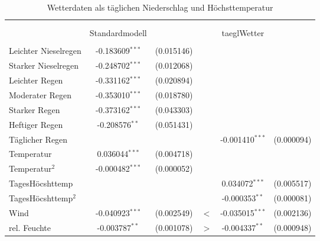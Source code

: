 \documentclass[a4paper,12pt]{thesis}
\begin{document}
\begin{table}[!htbp] \centering 
	\caption{Wetterdaten als täglichen Niederschlag und Höchsttemperatur} 
	\label{ExtraWetter} 
	\begin{tabular}{@{\extracolsep{-5pt}}lccccc} 
		\\[-1.8ex]\hline 
		\hline \\[-1.8ex] 
		\\[-1.8ex] & Standardmodell & & & taeglWetter & \\ 
		\hline \\[-1.8ex] 
		
		Leichter Nieselregen & -0.183609$^{***}$ & (0.015146) &  &  & \\ 
		
		Starker Nieselregen & -0.248702$^{***}$ & (0.012068) &  &  & \\ 
		
		Leichter Regen & -0.331162$^{***}$ & (0.020894) &  &  & \\ 
		
		Moderater Regen & -0.353010$^{***}$ & (0.018780) &  &  & \\ 
		
		Starker Regen & -0.373162$^{***}$ & (0.043303) &  &  & \\ 
		
		Heftiger Regen & -0.208576$^{**}$ & (0.051431) &  &  & \\ 
		
		Täglicher Regen &  &  &  & -0.001410$^{***}$ & (0.000094)\\ 
		
		Temperatur & 0.036044$^{***}$ & (0.004718) & & \\ 
		
		Temperatur$^2$ & -0.000482$^{***}$ & (0.000052) &  &  & \\ 
		
		TagesHöcshttemp & &  &  & 0.034072$^{***}$ & (0.005517)\\ 
		
		TagesHöcshttemp$^2$ &  &  &  & -0.000353$^{**}$ & (0.000081)\\ 
		
		Wind & -0.040923$^{***}$ & (0.002549) & $<$ & -0.035015$^{***}$ & (0.002136)\\ 
		
		rel. Feuchte & -0.003787$^{**}$ & (0.001078) & $>$ & -0.004337$^{**}$ & (0.000948)\\ 
		

\end{tabular}
\end{table}
\end{document}
